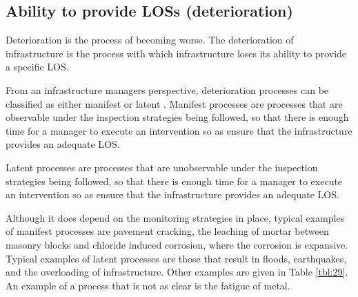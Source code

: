 \subsection{Ability to provide LOSs (deterioration)}

Deterioration is the process of becoming worse. The deterioration of infrastructure is the process with which infrastructure loses its ability to provide a specific LOS.

From an infrastructure managers perspective, deterioration processes can be classified as either manifest or latent \cite{Lethanh2015}. Manifest processes are processes that are observable under the inspection strategies being followed, so that there is enough time for a manager to execute an intervention so as ensure that the infrastructure provides an adequate LOS. 

Latent processes are processes that are unobservable under the inspection strategies being followed, so that there is enough time for a manager to execute an intervention so as ensure that the infrastructure provides an adequate LOS.

Although it does depend on the monitoring strategies in place, typical examples of manifest processes are pavement cracking, the leaching of mortar between masonry blocks and chloride induced corrosion, where the corrosion is expansive. Typical examples of latent processes are those that result in floods, earthquakes, and the overloading of infrastructure. Other examples are given in Table \ref{tbl:29}. An example of a process that is not as clear is the fatigue of metal.

